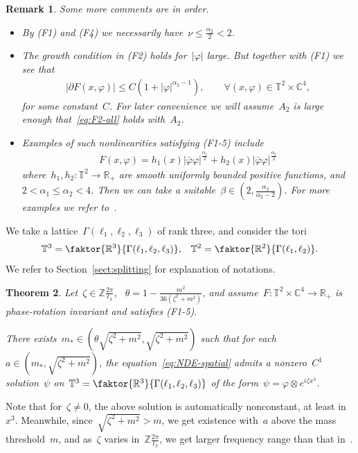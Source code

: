 \documentclass[11pt,final]{amsart}
\newcommand{\p}{\partial}
\newcommand{\R}{\mathbb{R}}
\newcommand{\C}{\mathbb{C}}
\newcommand{\T}{\mathbb{T}}
\newcommand{\bZ}{\mathbb{Z}}
\newtheorem{thm}{Theorem}[section]
\newtheorem{rmk}[thm]{Remark}
\begin{document}
\begin{rmk}
    Some more comments are in order. 
    \begin{itemize}
        \item[(i)]  By (F1) and (F4) we necessarily have~$\nu\leq \frac{\alpha_2}{2}<2$.

        \item[(ii)] The growth condition in (F2) holds for~$|\varphi|$ large. 
                    But together with (F1) we see that
                    \begin{align}\label{eq:F2-all}
                        |\p F(x,\varphi)|\leq C(1+|\varphi|^{\alpha_2-1}), \qquad \forall (x,\varphi)\in\T^2\times\C^4,  
                    \end{align}
                    for some constant~$C$. 
                    For later convenience we will assume~$A_2$ is large enough that~\eqref{eq:F2-all} holds with~$A_2$. 

        \item[(iii)] Examples of such nonlinearities satisfying (F1-5) include 
                    \begin{align}
                        F(x,\varphi)=h_1(x)|\bar{\varphi}\varphi|^{\frac{\alpha_1}{2}} + h_2(x)|\bar{\varphi}\varphi|^{\frac{\alpha_2}{2}}
                    \end{align}
                    where~$h_1,h_2\colon \T^2 \to \R_+$ are smooth uniformly bounded positive functions, and~$2<\alpha_1 \leq \alpha_2 <4$. 
                    Then we can take a suitable~$\beta\in (2,\frac{\alpha_2}{\alpha_2-2})$. 
                    For more examples we refer to~\cite{WZ2026Stationary}. 
    \end{itemize}
\end{rmk}

We take a lattice~$\Gamma(\ell_1,\ell_2,\ell_3)$ of rank three, and consider the tori 
\begin{align}
    \T^3 =\faktor{\R^3}{\Gamma(\ell_1,\ell_2,\ell_3)}, &  & 
    \T^2 =\faktor{\R^2}{\Gamma(\ell_1,\ell_2)}. 
\end{align}
We refer to Section~\ref{sect:splitting} for explanation of notations. 
\begin{thm}\label{thm:existence-splitting}
    Let~$\zeta\in\bZ\frac{2\pi}{\ell_3}$, ~$\theta=1-\frac{m^2}{36(\zeta^2+m^2)}$, and assume~$F\colon \T^2\times \C^4\to\R_+$ is phase-rotation invariant and satisfies (F1-5). 
    
    There exists~$m_*\in (\theta \sqrt{\zeta^2+m^2}, \sqrt{\zeta^2+m^2})$ such that for each~$a\in(m_*,\sqrt{\zeta^2+m^2})$, the equation~\eqref{eq:NDE-spatial} admits a nonzero~$C^1$ solution~$\psi$ on~$\T^3=\faktor{\R^3}{\Gamma(\ell_1,\ell_2,\ell_3)}$ of the form~$\psi=\varphi\otimes e^{i\zeta x^3}$.
\end{thm}
Note that for~$\zeta\neq 0$, the above solution is automatically nonconstant, at least in~$x^3$. 
Meanwhile, since~$\sqrt{\zeta^2+m^2}>m$, we get existence with~$a$ above the mass threshold~$m$, and as~$\zeta$ varies in~$\bZ\frac{2\pi}{\ell_3}$, we get larger frequency range than that in~\cite{WZ2026Stationary}. 
\end{document}
